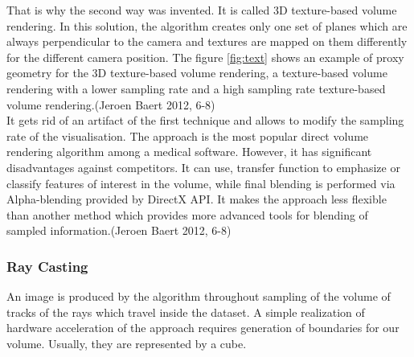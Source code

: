 \documentclass[twoside, english, 11pt]{report}
\begin{document}
That is why the second way was invented. It is called 3D texture-based volume rendering. In this solution, the algorithm creates only one set of planes which are always perpendicular to the camera and textures are mapped on them differently for the different camera position. The figure \ref{fig:text} shows an example of proxy geometry for the 3D texture-based volume rendering, a texture-based volume rendering with a lower sampling rate and a high sampling rate texture-based volume rendering.(Jeroen Baert 2012, 6-8)\\

It gets rid of an artifact of the first technique and allows to modify the sampling rate of the visualisation. The approach is the most popular direct volume rendering algorithm among a medical software. However, it has significant disadvantages against competitors. It can use, transfer function to emphasize or classify features of interest in the volume, while final blending is performed via Alpha-blending provided by DirectX API. It makes the approach less flexible than another method which provides more advanced tools for blending of sampled information.(Jeroen Baert 2012, 6-8)

\subsubsection{Ray Casting}

An image is produced by the algorithm throughout sampling of the volume of tracks of the rays which travel inside the dataset. A simple realization of hardware acceleration of the approach requires generation of boundaries for our volume. Usually, they are represented by a cube.\\
\end{document}
